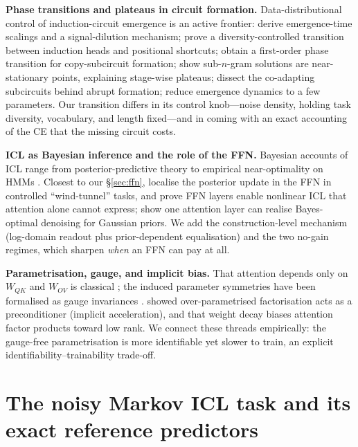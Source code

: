 \documentclass{article} %
\newcommand{\WQK}{W_{QK}}
\newcommand{\WOV}{W_{OV}}
\begin{document}
\textbf{Phase transitions and plateaus in circuit formation.}
Data-distributional control of induction-circuit emergence is an active frontier:
\citet{zucchet2025emergence} derive emergence-time scalings and a signal-dilution
mechanism; \citet{kawata2025shortcut} prove a diversity-controlled transition between
induction heads and positional shortcuts; \citet{lavie2026phase} obtain a first-order
phase transition for copy-subcircuit formation; \citet{varre2025learning} show
sub-$n$-gram solutions are near-stationary points, explaining stage-wise plateaus;
\citet{singh2024what} dissect the co-adapting subcircuits behind abrupt formation;
\citet{musat2025emergence} reduce emergence dynamics to a few parameters. Our
transition differs in its control knob---noise density, holding task diversity,
vocabulary, and length fixed---and in coming with an exact accounting of the CE that
the missing circuit costs.

\textbf{ICL as Bayesian inference and the role of the FFN.} Bayesian accounts of ICL
range from posterior-predictive theory \citep{wakayama2025incontext} to empirical
near-optimality on HMMs \citep{dai2025pretrained}. Closest to our \S\ref{sec:ffn},
\citet{agarwal2025bayesian} localise the posterior update in the FFN in controlled
``wind-tunnel'' tasks, and \citet{sun2025role} prove FFN layers enable nonlinear ICL
that attention alone cannot express; \citet{smart2025incontext} show one attention
layer can realise Bayes-optimal denoising for Gaussian priors. We add the
construction-level mechanism (log-domain readout plus prior-dependent equalisation)
and the two no-gain regimes, which sharpen \emph{when} an FFN can pay at all.

\textbf{Parametrisation, gauge, and implicit bias.} That attention depends only on
$\WQK$ and $\WOV$ is classical \citep{elhage2021mathematical}; the induced parameter
symmetries have been formalised as gauge invariances \citep{vannierop2024transformer}.
\citet{arora2018optimization} showed over-parametrised factorisation acts as a
preconditioner (implicit acceleration), and \citet{kobayashi2024weight} that weight
decay biases attention factor products toward low rank. We connect these threads
empirically: the gauge-free parametrisation is more identifiable yet slower to train,
an explicit identifiability--trainability trade-off.

\section{The noisy Markov ICL task and its exact reference predictors}
\label{sec:task}
\end{document}
